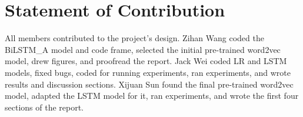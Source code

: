 \section{Statement of Contribution}
All members contributed to the project's design. Zihan Wang coded the BiLSTM\_A model and code frame, selected the initial pre-trained word2vec model, drew figures, and proofread the report. Jack Wei coded LR and LSTM models, fixed bugs, coded for running experiments, ran experiments, and wrote results and discussion sections. Xijuan Sun found the final pre-trained word2vec model, adapted the LSTM model for it, ran experiments, and wrote the first four sections of the report.
